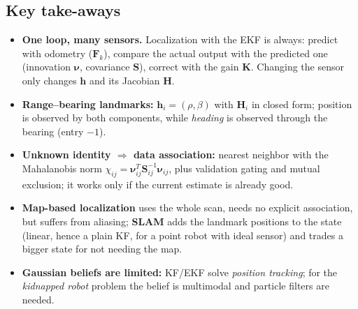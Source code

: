 \documentclass[11pt,a4paper]{article}
\theoremstyle{definition}
\theoremstyle{plain}
\theoremstyle{remark}
\begin{document}
\subsection{Key take-aways}
\begin{itemize}
  \item \textbf{One loop, many sensors.} Localization with the EKF is always: predict with odometry ($\bm F_k$), compare the actual output with the predicted one (innovation $\bm\nu$, covariance $\bm S$), correct with the gain $\bm K$. Changing the sensor only changes $\bm h$ and its Jacobian $\bm H$.
  \item \textbf{Range--bearing landmarks:} $\bm h_i=(\rho,\beta)$ with $\bm H_i$ in closed form; position is observed by both components, while \emph{heading} is observed through the bearing (entry $-1$).
  \item \textbf{Unknown identity $\Rightarrow$ data association:} nearest neighbor with the Mahalanobis norm $\chi_{ij}=\bm\nu_{ij}^T\bm S_{ij}^{-1}\bm\nu_{ij}$, plus validation gating and mutual exclusion; it works only if the current estimate is already good.
  \item \textbf{Map-based localization} uses the whole scan, needs no explicit association, but suffers from aliasing; \textbf{SLAM} adds the landmark positions to the state (linear, hence a plain KF, for a point robot with ideal sensor) and trades a bigger state for not needing the map.
  \item \textbf{Gaussian beliefs are limited:} KF/EKF solve \emph{position tracking}; for the \emph{kidnapped robot} problem the belief is multimodal and particle filters are needed.
\end{itemize}
\end{document}
